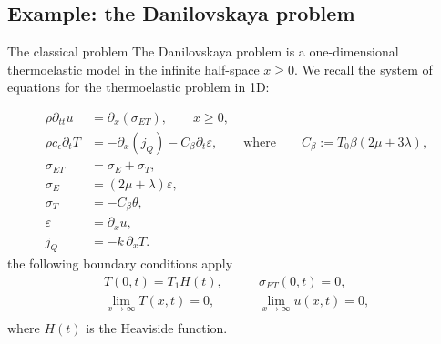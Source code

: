 \documentclass[aspectratio=169]{ISAE-Beamer}
\newcommand{\where}{\qquad \text{where} \qquad}
\begin{document}
\subsection{Example: the Danilovskaya problem}

\begin{frame}{The classical problem}
The Danilovskaya problem is a one-dimensional thermoelastic model in the infinite half-space $x\ge 0$. We recall the system of equations for the thermoelastic problem in 1D:

\begin{equation*}
\begin{aligned}
\displaystyle \rho \partial_{tt} u &= \partial_x ({\sigma}_{ET}), \qquad x\ge 0,  \\
\displaystyle \rho c_\epsilon \partial_{t} T &= -\partial_x(j_Q) - {C}_\beta \partial_t \varepsilon, \where {C}_\beta:=T_0 \beta(2\mu + 3\lambda),\\
{\sigma}_{ET} &= {\sigma}_E + {\sigma}_{T}, \\
{\sigma}_E &= (2\mu + \lambda) \varepsilon , \\
{\sigma}_T &= - {C}_\beta \theta,  \\
{\varepsilon} &= \partial_x u, \\
{j}_Q &= -k \, \partial_x T.
\end{aligned}
\end{equation*}
the following boundary conditions apply
\begin{equation*}
\begin{aligned}
T(0, t) = T_1 H(t), \\
\lim_{x \rightarrow \infty} T(x, t) = 0, \\
\end{aligned} \qquad 
\begin{aligned}
\sigma_{ET}(0, t) = 0, \\
\lim_{x \rightarrow \infty} u(x, t) = 0, \\
\end{aligned}
\end{equation*}
where $H(t)$ is the Heaviside function.
\end{frame}
\end{document}
